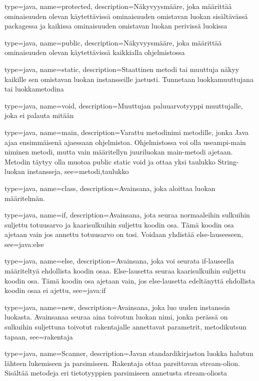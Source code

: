 {
	type=java,
	name=protected,
	description={Näkyvyysmääre, joka määrittää ominaisuuden olevan käytettävissä ominaisuuden
omistavan luokan sisältävässä packagessa ja kaikissa ominaisuuden omistavan luokan perivissä
luokissa}
}

{
	type=java,
	name=public,
	description={Näkyvyysmääre, joka määrittää ominaisuuden olevan käytettävissä kaikkialla
ohjelmistossa}
}

{
	type=java,
	name=static,
	description={Staattinen metodi tai muuttuja näkyy kaikille sen omistavan luokan instansseille
jaetusti. Tunnetaan luokkamuuttujana tai luokkametodina}
}

{
	type=java,
	name=void,
	description={Muuttujan paluuarvotyyppi muuttujalle, joka ei palauta mitään}
}

{
	type=java,
	name=main,
	description={Varattu metodinimi metodille, jonka Java ajaa ensimmäisenä ajaessaan ohjelmistoa.
Ohjelmistossa voi olla useampi-main niminen metodi, mutta vain määritellyn juuriluokan main-metodi
ajetaan. Metodin täytyy olla muotoa public static void ja ottaa yksi taulukko String-luokan
instansseja},
	see={metodi,taulukko}
}

{
	type=java,
	name=class,
	description={Avainsana, joka aloittaa luokan määritelmän.}
}

{
	type=java,
	name=if,
	description={Avainsana, jota seuraa normaaleihin sulkuihin suljettu totuusarvo ja
kaarisulkuihin suljettu koodin osa. Tämä koodin osa ajetaan vain jos annettu totuusarvo on
tosi. Voidaan yhdistää else-lauseeseen},
	see=java:else
}

{
	type=java,
	name=else,
	description={Avainsana, joka voi seurata if-lauseella määriteltyä ehdollista koodin osaa.
Else-lausetta seuraa kaarisulkuihin suljettu koodin osa. Tämä koodin osa ajetaan vain, jos
else-lausetta edeltänyttä ehdollista koodin osaa ei ajettu},
	see=java:if
}

{
	type=java,
	name=new,
	description={Avainsana, joka luo uuden instanssin luokasta. Avainsanaa seuraa aina toivotun
luokan nimi, jonka perässä on sulkuihin suljettuna toivotut rakentajalle annettavat parametrit,
metodikutsun tapaan},
	see=rakentaja
}

{
	type=java,
	name=Scanner,
	description={Javan standardikirjaston luokka halutun lähteen lukemiseen ja parsimiseen.
Rakentaja ottaa parsittavan stream-olion. Sisältää metodeja eri tietotyyppien parsimiseen
annetusta stream-oliosta}
}

